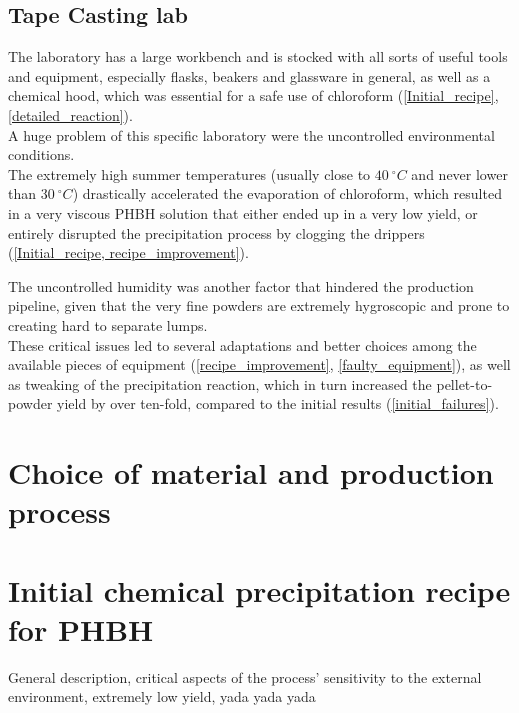 \documentclass{article}
\begin{document}
        \subsection{Tape Casting lab\label{Tape_casting}}

        The laboratory has a large workbench and is stocked with all sorts of useful tools and equipment, especially flasks,
        beakers and glassware 
        in general, as well as a chemical hood, which was essential for a safe use of chloroform 
        (\ref{Initial_recipe}, \ref{detailed_reaction}). \\ 

        A huge problem of this specific laboratory were the uncontrolled environmental conditions. \\

        The extremely high summer temperatures (usually close to $40 \ ^{\circ} C$ and never lower than 
        $30 \ ^{\circ} C$) drastically accelerated the evaporation of chloroform, which resulted in a 
        very viscous PHBH solution that either ended up in a very low yield, or entirely disrupted the 
        precipitation process by clogging the drippers (\ref{Initial_recipe, recipe_improvement}).

        The uncontrolled humidity was another factor that hindered the production pipeline, given that the very 
        fine powders are extremely hygroscopic and prone to creating hard to separate lumps. \\ 
        
        These critical issues led to several adaptations and better choices among the available pieces of
        equipment (\ref{recipe_improvement}, \ref{faulty_equipment}), as well as tweaking of the precipitation 
        reaction, which in turn increased the pellet-to-powder yield by over ten-fold, compared to the initial 
        results (\ref{initial_failures}).



    \clearpage
    \section{Choice of material and production process\label{Choice_material_process}}

    \clearpage
    \section{Initial chemical precipitation recipe for PHBH\label{Initial_recipe}}
    General description, critical aspects of the process' sensitivity to the external 
    environment, extremely low yield, yada yada yada 
\end{document}
